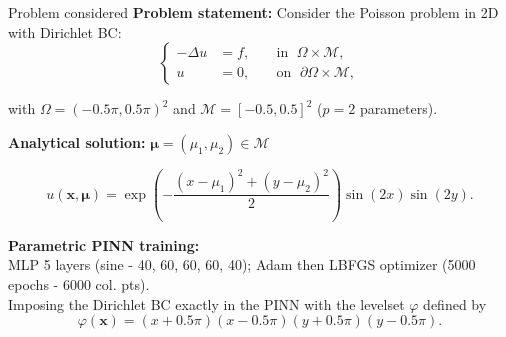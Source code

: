 \begin{frame}{Problem considered}
	\textbf{Problem statement:} Consider the Poisson problem in 2D with Dirichlet BC:
	\vspace{-5pt}
	\begin{equation*}
		\left\{
		\begin{aligned}
			-\Delta u & = f, \; &  & \text{in } \; \Omega \times \mathcal{M},         \\
			u         & =0, \;  &  & \text{on } \; \partial\Omega \times \mathcal{M},
		\end{aligned}
		\right.
	\end{equation*}

	\vspace{-5pt}
	with $\Omega=(-0.5 \pi, 0.5 \pi)^2$ and $\mathcal{M}=[-0.5,0.5]^2$ ($p=2$ parameters).

	\vspace{8pt}
	\textbf{Analytical solution:} $\bm{\mu}=(\mu_1,\mu_2) \in \mathcal{M}$

	\vspace{-5pt}
	\begin{equation*}
		u(\bm{x},\bm{\mu})=\exp\left(-\frac{(x-\mu_1)^2+(y-\mu_2)^2}{2}\right)\sin(2 x)\sin(2 y).
	\end{equation*}

	\vspace{12pt}
	\textbf{Parametric PINN training:} \\
	MLP 5 layers (sine - 40, 60, 60, 60, 40); Adam then LBFGS optimizer (5000 epochs - 6000 col. pts). \\
	Imposing the Dirichlet BC exactly in the PINN with the levelset $\varphi$ defined by
	$$\varphi(\bm{x})=(x+0.5\pi)(x-0.5\pi)(y+0.5\pi)(y-0.5\pi).$$
\end{frame}

